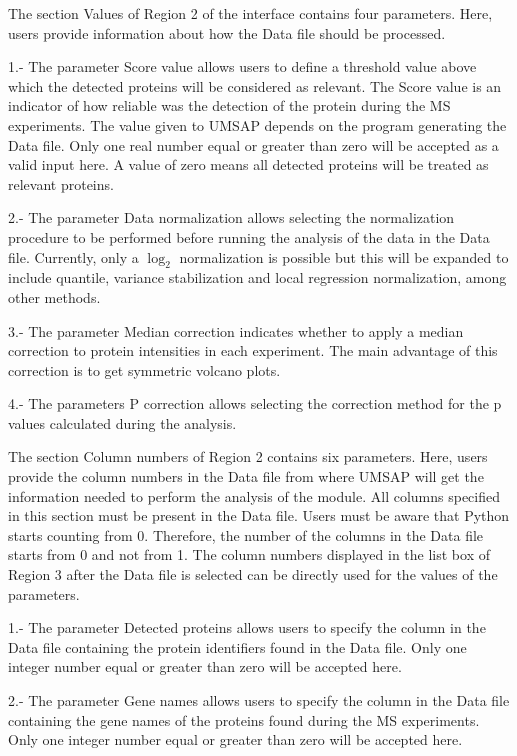 The section Values of Region \num{2} of the interface contains four parameters. Here, users provide information about how the Data file should be processed.

\num{1}.- The parameter Score value\label{par:protprofScoreValue} allows users to define a threshold value above which the detected proteins will be considered as relevant. The Score value is an indicator of how reliable was the detection of the protein during the MS experiments. The value given to UMSAP depends on the program generating the Data file. Only one real number equal or greater than zero will be accepted as a valid input here. A value of zero means all detected proteins will be treated as relevant proteins.

\num{2}.-  The parameter Data normalization allows selecting the normalization procedure to be performed before running the analysis of the data in the Data file. Currently, only a $\log_2$ normalization is possible but this will be expanded to include quantile, variance stabilization and local regression normalization, among other methods. 

\num{3}.- The parameter Median correction indicates whether to apply a median correction to protein intensities in each experiment. The main advantage of this correction is to get symmetric volcano plots.

\num{4}.- The parameters P correction allows selecting the correction method for the p values calculated during the analysis. 

The section Column numbers of Region \num{2} contains six parameters. Here, users provide the column numbers in the Data file from where UMSAP will get the information needed to perform the analysis of the module. All columns specified in this section must be present in the Data file. Users must be aware that Python starts counting from \num{0}. Therefore, the number of the columns in the Data file starts from \num{0} and not from \num{1}. The column numbers displayed in the list box of Region \num{3} after the Data file is selected can be directly used for the values of the parameters. 

\num{1}.- The parameter Detected proteins allows users to specify the column in the Data file containing the protein identifiers found in the Data file. Only one integer number equal or greater than zero will be accepted here. 

\num{2}.- The parameter Gene names allows users to specify the column in the Data file containing the gene names of the proteins found during the MS experiments. Only one integer number equal or greater than zero will be accepted here. 

